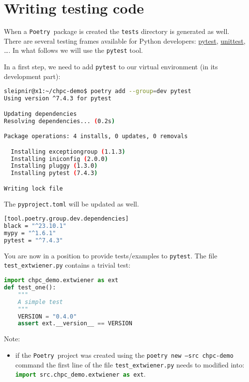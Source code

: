 \documentclass[10pt]{article}
\newcommand{\POETRY}{\texttt{Poetry}}
\begin{document}
\section{Writing testing code}
When a \POETRY\ package is created the \texttt{tests} directory is generated as well.
There are several testing frames available for Python developers: \href{https://docs.pytest.org/en/stable/}{pytest}\;\cite{PYTEST:2023}, 
\href{https://docs.python.org/3/library/unittest.html}{unittest}\;\cite{UNITTEST:2023}, \ldots.
In what follows we will use the \texttt{pytest} tool.

In a first step, we need to add \texttt{pytest} to our virtual environment (in its development part):
\begin{lstlisting}[language=bash]
sleipnir@x1:~/chpc-demo$ poetry add --group=dev pytest
Using version ^7.4.3 for pytest

Updating dependencies
Resolving dependencies... (0.2s)

Package operations: 4 installs, 0 updates, 0 removals

  Installing exceptiongroup (1.1.3)
  Installing iniconfig (2.0.0)
  Installing pluggy (1.3.0)
  Installing pytest (7.4.3)

Writing lock file
\end{lstlisting}

The \texttt{pyproject.toml} will be updated as well.
\begin{lstlisting}[language=bash]
[tool.poetry.group.dev.dependencies]
black = "^23.10.1"
mypy = "^1.6.1"
pytest = "^7.4.3"
\end{lstlisting}

You are now in a position to provide tests/examples to \texttt{pytest}. The file \texttt{test\_extwiener.py} 
contains a trivial test:
\begin{lstlisting}[language=python]
import chpc_demo.extwiener as ext
def test_one():
    """
    A simple test
    """
    VERSION = "0.4.0"
    assert ext.__version__ == VERSION
\end{lstlisting}   
Note:
\begin{itemize}
    \item if the \POETRY\ project was created using the \texttt{poetry new --src chpc-demo} command the first line
	    of the file \texttt{test\_extwiener.py} needs to modified into: \lstinline[language=python]{import src.chpc_demo.extwiener as ext}.
\end{itemize}		
\end{document}
